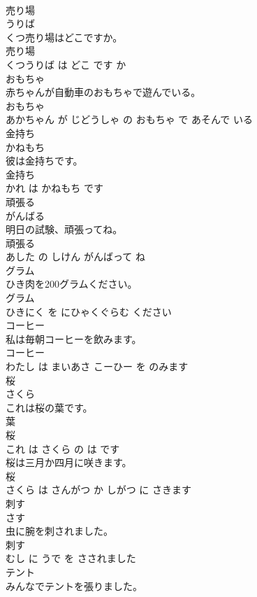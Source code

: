\documentclass[8pt]{extreport}
\begin{document}
\begin{CJK}{UTF8}{min}
\\	売り場	
\\	うりば			
\\	くつ売り場はどこですか。	
\\	売り場 
\\	くつうりば は どこ です か			
\\	おもちゃ	
\\	赤ちゃんが自動車のおもちゃで遊んでいる。	
\\	おもちゃ 
\\	あかちゃん が じどうしゃ の おもちゃ で あそんで いる			
\\	金持ち	
\\	かねもち			
\\	彼は金持ちです。	
\\	金持ち 
\\	かれ は かねもち です			
\\	頑張る	
\\	がんばる			
\\	明日の試験、頑張ってね。	
\\	頑張る 
\\	あした の しけん がんばって ね			
\\	グラム	
\\	ひき肉を200グラムください。	
\\	グラム 
\\	ひきにく を にひゃくぐらむ ください			
\\	コーヒー	
\\	私は毎朝コーヒーを飲みます。	
\\	コーヒー 
\\	わたし は まいあさ こーひー を のみます			
\\	桜	
\\	さくら			
\\	これは桜の葉です。	
\\	葉 
\\	桜 
\\	これ は さくら の は です			
\\	桜は三月か四月に咲きます。	
\\	桜 
\\	さくら は さんがつ か しがつ に さきます			
\\	刺す	
\\	さす			
\\	虫に腕を刺されました。	
\\	刺す 
\\	むし に うで を さされました			
\\	テント	
\\	みんなでテントを張りました。	

\end{CJK}
\end{document}
